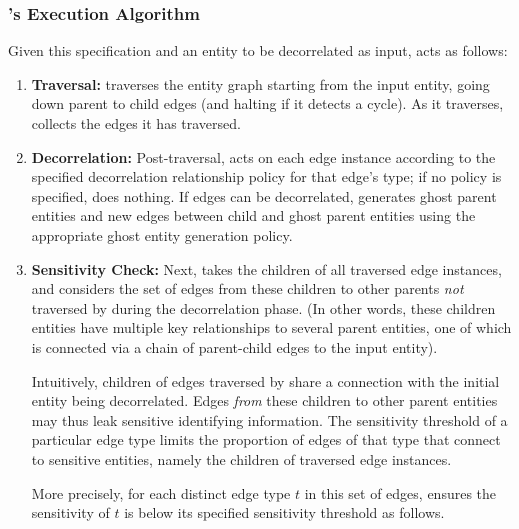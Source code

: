 \subsubsection{\sys{}'s Execution Algorithm}
Given this specification and an entity to be decorrelated as input, \sys{} acts as follows:
\begin{enumerate}
    \item \textbf{Traversal:} \sys{} traverses the entity graph starting from the input entity,
        going down parent to child edges (and halting if it detects a cycle).  As it traverses,
        \sys{} collects the edges it has traversed. 
    \item \textbf{Decorrelation:} Post-traversal, \sys{} acts on each edge instance according to the specified decorrelation
        relationship policy for that edge's type; if no policy is specified, \sys{} does nothing. If edges can be
        decorrelated, \sys{} generates ghost parent entities and new edges between 
        child and ghost parent entities using the appropriate ghost entity 
        generation policy.
    \item \textbf{Sensitivity Check:} Next, \sys{} takes the children of all traversed edge
        instances, and considers the set of edges from these children to other parents
        \emph{not} traversed by \sys{} during the decorrelation phase. (In other words, these
        children entities have multiple key relationships to several parent entities, one of
        which is connected via a chain of parent-child edges to the input entity).

        Intuitively, children of edges traversed by \sys{} share a connection with the initial
        entity being decorrelated. Edges \emph{from} these children to other parent entities may
        thus leak sensitive identifying information.  The sensitivity threshold of a particular edge type
        limits the proportion of edges of that type that connect to sensitive entities,
        namely the children of traversed edge instances. 

        More precisely, for each distinct edge type $t$ in this set of edges, \sys{} ensures the
        sensitivity of $t$ is below its specified sensitivity threshold as follows. 


\end{enumerate}
